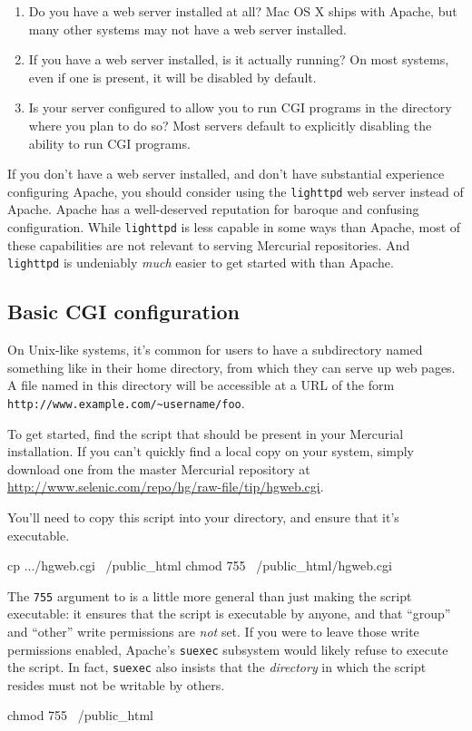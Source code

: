 \begin{enumerate}
\item Do you have a web server installed at all?  Mac OS X ships with
  Apache, but many other systems may not have a web server installed.
\item If you have a web server installed, is it actually running?  On
  most systems, even if one is present, it will be disabled by
  default.
\item Is your server configured to allow you to run CGI programs in
  the directory where you plan to do so?  Most servers default to
  explicitly disabling the ability to run CGI programs.
\end{enumerate}

If you don't have a web server installed, and don't have substantial
experience configuring Apache, you should consider using the
\texttt{lighttpd} web server instead of Apache.  Apache has a
well-deserved reputation for baroque and confusing configuration.
While \texttt{lighttpd} is less capable in some ways than Apache, most
of these capabilities are not relevant to serving Mercurial
repositories.  And \texttt{lighttpd} is undeniably \emph{much} easier
to get started with than Apache.

\subsection{Basic CGI configuration}

On Unix-like systems, it's common for users to have a subdirectory
named something like  in their home directory,
from which they can serve up web pages.  A file named 
in this directory will be accessible at a URL of the form
\texttt{http://www.example.com/\~{}username/foo}.

To get started, find the  script that should be
present in your Mercurial installation.  If you can't quickly find a
local copy on your system, simply download one from the master
Mercurial repository at
\url{http://www.selenic.com/repo/hg/raw-file/tip/hgweb.cgi}.

You'll need to copy this script into your 
directory, and ensure that it's executable.
\begin{codesample2}
  cp .../hgweb.cgi ~/public_html
  chmod 755 ~/public_html/hgweb.cgi
\end{codesample2}
The \texttt{755} argument to  is a little more general
than just making the script executable: it ensures that the script is
executable by anyone, and that ``group'' and ``other'' write
permissions are \emph{not} set.  If you were to leave those write
permissions enabled, Apache's \texttt{suexec} subsystem would likely
refuse to execute the script.  In fact, \texttt{suexec} also insists
that the \emph{directory} in which the script resides must not be
writable by others.
\begin{codesample2}
  chmod 755 ~/public_html
\end{codesample2}

